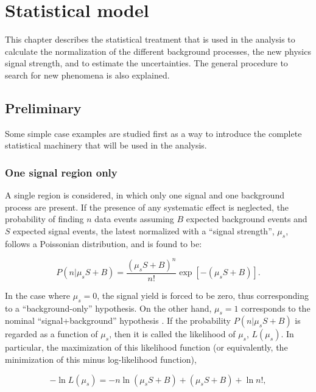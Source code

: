 \chapter{Statistical model}
    \label{chapter:StatisticalModel}

This chapter describes the statistical treatment that is used in the analysis to calculate the normalization of the different background processes, the new physics signal strength, and to estimate the uncertainties.
The general procedure to search for new phenomena is also explained.


\section{Preliminary}
    \label{sec:StatisticsPreliminary}

Some simple case examples are studied first as a way to introduce the complete statistical machinery that will be used in the analysis.

\subsection{One signal region only}

A single region is considered, in which only one signal and one background process are present.
If the presence of any systematic effect is neglected, the probability of finding $n$ data events assuming $B$ expected background events and $S$ expected signal events, the latest normalized with a ``signal strength'', $\mu_s$, follows a Poissonian distribution, and is found to be:

\begin{equation}
P(n | \mu_s S + B) = \frac{(\mu_s S + B)^n}{n!} \exp{\left[-(\mu_s S + B)\right]}.
\label{eq:simplifiedPoisson}
\end{equation}

In the case where $\mu_s=0$, the signal yield is forced to be zero, thus corresponding to a ``background-only'' hypothesis.
On the other hand, $\mu_s=1$ corresponds to the nominal ``signal+background'' hypothesis \cite{Cranmer:2012sba}.
If the probability $P(n | \mu_s S + B)$ is regarded as a function of $\mu_s$, then it is called the likelihood of $\mu_s$, $L(\mu_s)$.
In particular, the maximization of this likelihood function (or equivalently, the minimization of this minus log-likelihood function),

\begin{equation}
-\ln{L(\mu_s)} = -n \ln{(\mu_s S + B)} + (\mu_s S + B) + \ln{n!},
\label{eq:simplifiedLogLikelihood}
\end{equation}

